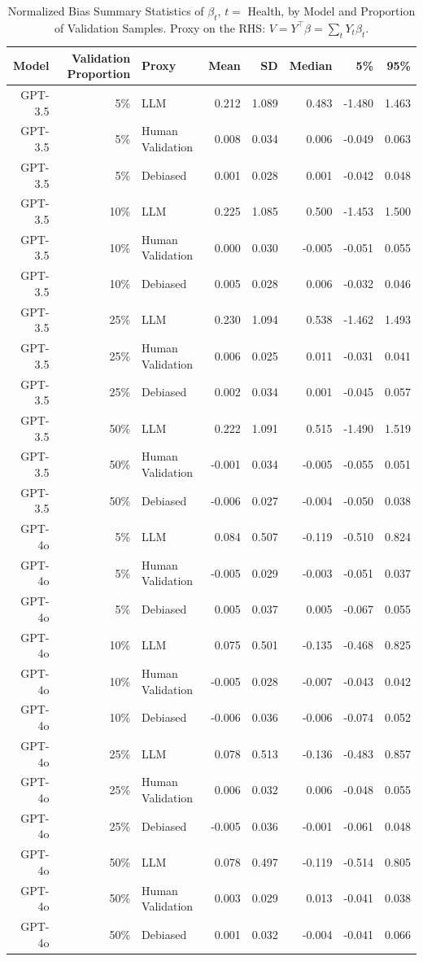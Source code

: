 \begin{table}

\caption{\label{tab:unnamed-chunk-1}Normalized Bias Summary Statistics of $\beta_{t}$, $t=$ Health, by Model and Proportion of Validation Samples.
      Proxy on the RHS: $V = Y^\top \beta = \sum_{t} Y_t \beta_t$.}
\centering
\begin{tabular}[t]{rrlrrrrr}
\toprule
Model & Validation Proportion & Proxy & Mean & SD & Median & 5\% & 95\%\\
\midrule
GPT-3.5 & 5\% & LLM & 0.212 & 1.089 & 0.483 & -1.480 & 1.463\\
GPT-3.5 & 5\% & Human Validation & 0.008 & 0.034 & 0.006 & -0.049 & 0.063\\
GPT-3.5 & 5\% & Debiased & 0.001 & 0.028 & 0.001 & -0.042 & 0.048\\
GPT-3.5 & 10\% & LLM & 0.225 & 1.085 & 0.500 & -1.453 & 1.500\\
GPT-3.5 & 10\% & Human Validation & 0.000 & 0.030 & -0.005 & -0.051 & 0.055\\
GPT-3.5 & 10\% & Debiased & 0.005 & 0.028 & 0.006 & -0.032 & 0.046\\
GPT-3.5 & 25\% & LLM & 0.230 & 1.094 & 0.538 & -1.462 & 1.493\\
GPT-3.5 & 25\% & Human Validation & 0.006 & 0.025 & 0.011 & -0.031 & 0.041\\
GPT-3.5 & 25\% & Debiased & 0.002 & 0.034 & 0.001 & -0.045 & 0.057\\
GPT-3.5 & 50\% & LLM & 0.222 & 1.091 & 0.515 & -1.490 & 1.519\\
GPT-3.5 & 50\% & Human Validation & -0.001 & 0.034 & -0.005 & -0.055 & 0.051\\
GPT-3.5 & 50\% & Debiased & -0.006 & 0.027 & -0.004 & -0.050 & 0.038\\
GPT-4o & 5\% & LLM & 0.084 & 0.507 & -0.119 & -0.510 & 0.824\\
GPT-4o & 5\% & Human Validation & -0.005 & 0.029 & -0.003 & -0.051 & 0.037\\
GPT-4o & 5\% & Debiased & 0.005 & 0.037 & 0.005 & -0.067 & 0.055\\
GPT-4o & 10\% & LLM & 0.075 & 0.501 & -0.135 & -0.468 & 0.825\\
GPT-4o & 10\% & Human Validation & -0.005 & 0.028 & -0.007 & -0.043 & 0.042\\
GPT-4o & 10\% & Debiased & -0.006 & 0.036 & -0.006 & -0.074 & 0.052\\
GPT-4o & 25\% & LLM & 0.078 & 0.513 & -0.136 & -0.483 & 0.857\\
GPT-4o & 25\% & Human Validation & 0.006 & 0.032 & 0.006 & -0.048 & 0.055\\
GPT-4o & 25\% & Debiased & -0.005 & 0.036 & -0.001 & -0.061 & 0.048\\
GPT-4o & 50\% & LLM & 0.078 & 0.497 & -0.119 & -0.514 & 0.805\\
GPT-4o & 50\% & Human Validation & 0.003 & 0.029 & 0.013 & -0.041 & 0.038\\
GPT-4o & 50\% & Debiased & 0.001 & 0.032 & -0.004 & -0.041 & 0.066\\
\bottomrule
\end{tabular}
\end{table}
